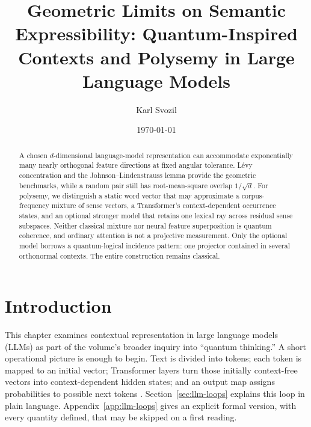 \documentclass[
  aps,
  reprint,
  superscriptaddress,
  floatfix,
  nofootinbib,
  longbibliography
]{revtex4-2}
\begin{document}
\title{Geometric Limits on Semantic Expressibility: Quantum-Inspired Contexts and Polysemy in Large Language Models}

\author{Karl Svozil}

\date{\today}

\begin{abstract}
A chosen $d$-dimensional language-model representation can accommodate
exponentially many nearly orthogonal feature directions at fixed angular
tolerance.  L\'evy concentration and the Johnson--Lindenstrauss lemma provide
the geometric benchmarks, while a random pair still has root-mean-square
overlap $1/\sqrt d$.  For polysemy, we distinguish a static word vector that
may approximate a corpus-frequency mixture of sense vectors, a Transformer's
context-dependent occurrence states, and an optional stronger model that
retains one lexical ray across residual sense subspaces.  Neither classical
mixture nor neural feature superposition is quantum coherence, and ordinary
attention is not a projective measurement.  Only the optional model borrows a
quantum-logical incidence pattern: one projector contained in several
orthonormal contexts.  The entire construction remains classical.
\end{abstract}

\maketitle


\section{Introduction}
\label{sec:intro}

This chapter examines contextual representation in large language models
(LLMs) as part of the volume's broader inquiry into ``quantum thinking.''  A
short operational picture is enough to begin.  Text is divided into tokens;
each token is mapped to an initial vector; Transformer layers turn those
initially context-free vectors into context-dependent hidden states; and an
output map assigns probabilities to possible next tokens
\cite{Vaswani-2017-Attention}.  Section~\ref{sec:llm-loops} explains this loop
in plain language.  Appendix~\ref{app:llm-loops} gives an explicit formal
version, with every quantity defined, that may be skipped on a first reading.
\end{document}
